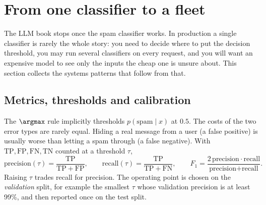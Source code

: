 \section{From one classifier to a fleet}\label{sec:classify:fleet}

The LLM book stops once the spam classifier works. In production a single classifier is
rarely the whole story: you need to decide where to put the decision threshold, you may
run several classifiers on every request, and you will want an expensive model to see
only the inputs the cheap one is unsure about. This section collects the systems
patterns that follow from that.

\subsection{Metrics, thresholds and calibration}

The $\argmax$ rule implicitly thresholds $p(\text{spam}\mid x)$ at $0.5$. The costs of
the two error types are rarely equal. Hiding a real message from a user (a false
positive) is usually worse than letting a spam through (a false negative). With
$\mathrm{TP},\mathrm{FP},\mathrm{FN},\mathrm{TN}$ counted at a threshold $\tau$,
\begin{equation}
\text{precision}(\tau) = \frac{\mathrm{TP}}{\mathrm{TP}+\mathrm{FP}},\qquad
\text{recall}(\tau) = \frac{\mathrm{TP}}{\mathrm{TP}+\mathrm{FN}},\qquad
F_1 = \frac{2\,\text{precision}\cdot\text{recall}}{\text{precision}+\text{recall}}.
\label{eq:classify:prf}
\end{equation}
Raising $\tau$ trades recall for precision. The operating point is chosen on the
\emph{validation} split, for example the smallest $\tau$ whose validation precision is
at least 99\%, and then reported once on the test split.

